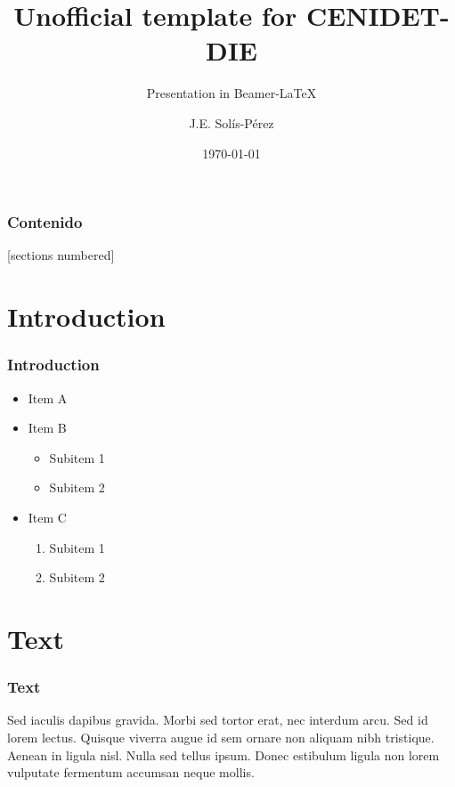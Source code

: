 \documentclass{beamer}
\title{Unofficial template for CENIDET-DIE}
\subtitle{Presentation in Beamer-\LaTeX}
\author{J.E. Solís-Pérez}
\date{\today}
\institute{\url{jesolis@cenidet.edu.mx}}
\numberwithin{figure}{section}
\numberwithin{equation}{section}
\begin{document}

\begin{frame}[plain,t]
\titlepage
\end{frame}


\begin{frame}
  \addtocounter{framenumber}{-1}
  \scriptsize
  \frametitle{Contenido}
  [sections numbered]
  \tableofcontents[hideallsubsections]
\end{frame}


\section{Introduction}
\begin{frame}
 \frametitle{Introduction}
 \begin{itemize}
  \item Item A
  \item Item B
  
  \begin{itemize}
   \item Subitem 1
   \item Subitem 2
  \end{itemize}
  
  \item Item C
  \begin{enumerate}
   \item Subitem 1
   \item Subitem 2
  \end{enumerate}
 \end{itemize}
\end{frame}


\section{Text}
\begin{frame}
 \frametitle{Text}
 Sed iaculis dapibus gravida. Morbi sed tortor erat, nec interdum arcu.
 Sed id lorem lectus. Quisque viverra augue id sem ornare non aliquam nibh  tristique. Aenean in ligula nisl. Nulla sed tellus ipsum. Donec estibulum
 ligula non lorem vulputate fermentum accumsan neque mollis. \\~\\
\end{frame}
\end{document}
